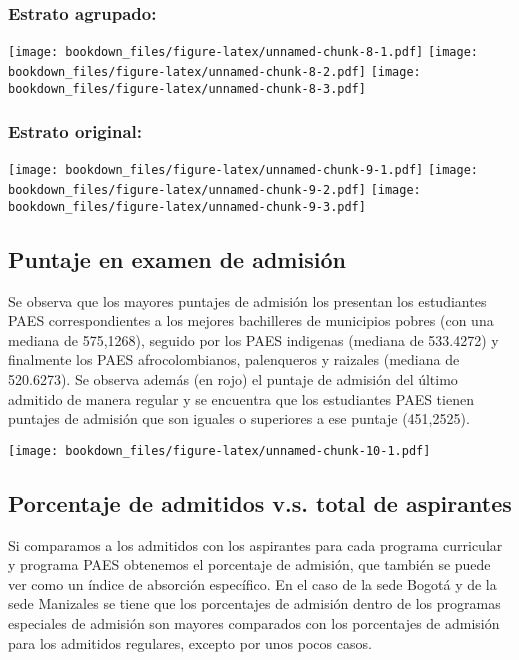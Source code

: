 \documentclass[]{article}
\theoremstyle{definition}
\theoremstyle{definition}
\theoremstyle{definition}
\theoremstyle{remark}
\begin{document}
\subsubsection{Estrato agrupado:}\label{estrato-agrupado}

\texttt{[image: bookdown\_files/figure-latex/unnamed-chunk-8-1.pdf]}
\texttt{[image: bookdown\_files/figure-latex/unnamed-chunk-8-2.pdf]}
\texttt{[image: bookdown\_files/figure-latex/unnamed-chunk-8-3.pdf]}

\subsubsection{Estrato original:}\label{estrato-original}

\texttt{[image: bookdown\_files/figure-latex/unnamed-chunk-9-1.pdf]}
\texttt{[image: bookdown\_files/figure-latex/unnamed-chunk-9-2.pdf]}
\texttt{[image: bookdown\_files/figure-latex/unnamed-chunk-9-3.pdf]}

\subsection{Puntaje en examen de
admisión}\label{puntaje-en-examen-de-admision}

Se observa que los mayores puntajes de admisión los presentan los
estudiantes PAES correspondientes a los mejores bachilleres de
municipios pobres (con una mediana de 575,1268), seguido por los PAES
indigenas (mediana de 533.4272) y finalmente los PAES afrocolombianos,
palenqueros y raizales (mediana de 520.6273). Se observa además (en
rojo) el puntaje de admisión del último admitido de manera regular y se
encuentra que los estudiantes PAES tienen puntajes de admisión que son
iguales o superiores a ese puntaje (451,2525).

\texttt{[image: bookdown\_files/figure-latex/unnamed-chunk-10-1.pdf]}

\subsection{Porcentaje de admitidos v.s. total de
aspirantes}\label{porcentaje-de-admitidos-v.s.-total-de-aspirantes}

Si comparamos a los admitidos con los aspirantes para cada programa
curricular y programa PAES obtenemos el porcentaje de admisión, que
también se puede ver como un índice de absorción específico. En el caso
de la sede Bogotá y de la sede Manizales se tiene que los porcentajes de
admisión dentro de los programas especiales de admisión son mayores
comparados con los porcentajes de admisión para los admitidos regulares,
excepto por unos pocos casos.
\end{document}
